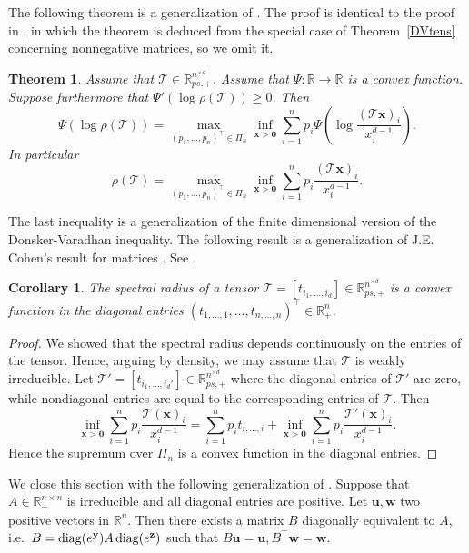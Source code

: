 \documentclass{amsart}
\newcommand{\diag}{\operatorname{diag}}
\newcommand{\R}{\mathbb{R}}
\newcommand{\uu}{\mathbf{u}}
\newcommand{\w}{\mathbf{w}}
\newcommand{\x}{\mathbf{x}}
\newcommand{\y}{\mathbf{y}}
\newcommand{\z}{\mathbf{z}}
\newcommand{\0}{\mathbf{0}}
\newcommand{\1}{\mathbf{1}}
\newcommand{\cT}{\mathcal{T}}
\def\diag{\mathop{{\rm diag}}\nolimits}
\newcommand{\trans}{^\top}
\newtheorem{theorem}[theo]{Theorem}
\newtheorem{corollary}[theo]{Corollary}
\theoremstyle{remark}
\numberwithin{equation}{section} %
\renewcommand{\ge}{\geqslant}
\begin{document}
 The following theorem is a generalization of \cite[Theorem  3.3]{Fri81}.  The proof is identical to the proof  in \cite{Fri81}, in which the theorem is deduced from the special case of Theorem~\ref{DVtens} concerning nonnegative matrices, 
so we omit it. 
 \begin{theorem}\label{thm3.3F}  
Assume that $\cT\in \R_{ps,+}^{n^{\times d}}$.
%
%
Assume that $\Psi:\R\to \R$ is a convex function.  
%
Suppose furthermore that $\Psi'(\log \rho(\cT))\ge 0$.  Then
 \[\Psi(\log\rho(\cT))=\max_{(p_1,\ldots,p_n)\trans\in \Pi_n}\inf_{\x>\0}\sum_{i=1}^n p_i  \Psi(\log\frac{(\cT\x)_i}{x_i^{d-1}}).\]
 In particular
 \begin{equation}\label{DVten1}
 \rho(\cT)=\max_{(p_1,\ldots,p_n)\trans\in \Pi_n}\inf_{\x>\0}\sum_{i=1}^n p_i  \frac{(\cT\x)_i}{x_i^{d-1}}.
 \end{equation}
 \end{theorem}
 The last inequality is a generalization of the finite dimensional version of the Donsker-Varadhan inequality.
 The following result is a generalization of J.E. Cohen's result for matrices \cite{Coh79}.  See \cite[Theorem 3.1]{ZQL10}. 
%
%
%


%
 \begin{corollary}\label{convrhodiagel}  The spectral radius of a tensor
 $\cT=[t_{i_1,\ldots,i_d}]\in\R_{ps,+}^{n^{\times d}}$ is a convex function
%
 in the diagonal entries $(t_{1,\ldots,1},\ldots,t_{n,\ldots,n})\trans\in\R_+^n$. 
 \end{corollary}
 \begin{proof} We showed that the spectral radius depends continuously
on the entries of the tensor. Hence, arguing by density, we may assume that $\cT$ is weakly irreducible.
Let $\cT'=[t_{i_1,\ldots,i_d'}]\in\R_{ps,+}^{n^{\times d}}$ where the diagonal entries 
 of $\cT'$ are zero, while nondiagonal entries are equal to the corresponding entries of $\cT$.  Then 
 \[\inf_{\x>\0 } \sum_{i=1}^n p_i\frac{\cT(\x)_i}{x_i^{d-1}}=\sum_{i=1}^n p_i t_{i,\ldots,i} +\inf_{\x>\0 } \sum_{i=1}^n p_i\frac{\cT'(\x)_i}{x_i^{d-1}}.\]
 Hence the supremum over $\Pi_n$ is a convex function in the diagonal entries.  \end{proof}
 
 We close this section with the following generalization of \cite[Theorem 3.2]{FK75}.  Suppose that $A\in\R_+^{n\times n}$ is irreducible and all diagonal entries
 are positive.  Let $\uu,\w$ two positive vectors in $\R^n$.  Then there exists a matrix $B$ diagonally equivalent to $A$, i.e.\ $B=\diag(e^{\y})A\diag(e^{\z})$
 such that $B\uu=\uu, B\trans \w=\w$.
 
\end{document}
